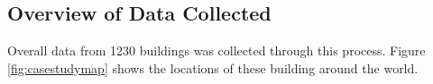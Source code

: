 \subsection{Overview of Data Collected}
\label{sec:datacollected}

Overall data from 1230 buildings was collected through this process. Figure \ref{fig:casestudymap} shows the locations of these building around the world.
